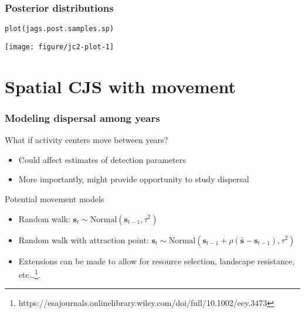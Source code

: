 \documentclass[color=usenames,dvipsnames]{beamer}\usepackage[]{graphicx}\usepackage[]{color}
\makeatletter
\newcommand{\hlstd}[1]{\textcolor[rgb]{0,0,0}{#1}}%
\newcommand{\hlkwd}[1]{\textcolor[rgb]{0.004,0.004,0.506}{#1}}%
\newenvironment{kframe}{%
 \def\at@end@of@kframe{}%
 \ifinner\ifhmode%
  \def\at@end@of@kframe{\end{minipage}}%
  \begin{minipage}{\columnwidth}%
 \fi\fi%
 \def\FrameCommand##1{\hskip\@totalleftmargin \hskip-\fboxsep
 \colorbox{shadecolor}{##1}\hskip-\fboxsep
     \hskip-\linewidth \hskip-\@totalleftmargin \hskip\columnwidth}%
 \MakeFramed {\advance\hsize-\width
   \@totalleftmargin\z@ \linewidth\hsize
   \@setminipage}}%
 {\par\unskip\endMakeFramed%
 \at@end@of@kframe}
\newenvironment{knitrout}{}{} %
\makeatother
\begin{document}
\begin{frame}[fragile]
  \frametitle{Posterior distributions}
\begin{knitrout}\scriptsize
{}\color{fgcolor}\begin{kframe}
\begin{alltt}
\hlkwd{plot}\hlstd{(jags.post.samples.sp)}
\end{alltt}
\end{kframe}

{\centering \texttt{[image: figure/jc2-plot-1]} 

}


\end{knitrout}
\end{frame}










\section{Spatial CJS with movement}









\begin{frame}
  \frametitle{Modeling dispersal among years}
  {\large What if activity centers move between years?}
  \begin{itemize}
    \normalsize
    \item Could affect estimates of detection parameters
    \item More importantly, might provide opportunity to study dispersal
  \end{itemize}
  \pause
  \vfill
  {\large Potential movement models}
  \begin{itemize}
    \normalsize
    \item Random walk: ${\bm s}_t \sim \mbox{Normal}({\bm s}_{t-1}, \tau^2)$
    \item Random walk with attraction point: ${\bm s}_t \sim \mbox{Normal}({\bm  s}_{t-1} + \rho(\bar{\bm s} - {\bm s}_{t-1}), \tau^2)$
    \item Extensions can be made to allow for resource selection,
      landscape resistance, etc\dots\footnote{https://esajournals.onlinelibrary.wiley.com/doi/full/10.1002/ecy.3473}. 
  \end{itemize}
\end{frame}
\end{document}
